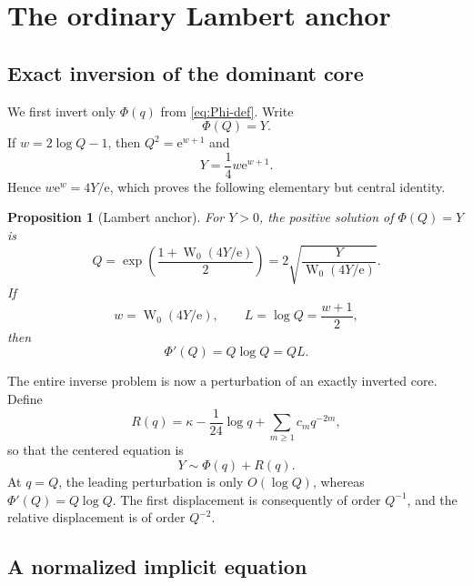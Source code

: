 \documentclass[11pt,oneside]{article}
\theoremstyle{plain}
\newtheorem{proposition}[theorem]{Proposition}
\theoremstyle{definition}
\theoremstyle{remark}
\newcommand{\W}{\operatorname{W}}
\newcommand{\e}{\mathrm{e}}
\begin{document}
\section{The ordinary Lambert anchor}
\label{sec:ordinary-anchor}

\subsection{Exact inversion of the dominant core}

We first invert only \(\Phi(q)\) from \eqref{eq:Phi-def}.  Write
\begin{equation}
 \Phi(Q)=Y.
 \label{eq:Phi-anchor-equation}
\end{equation}
If \(w=2\log Q-1\), then \(Q^2=\e^{w+1}\) and
\[
 Y=\frac14w\e^{w+1}.
\]
Hence \(w\e^w=4Y/\e\), which proves the following elementary but central
identity.

\begin{proposition}[Lambert anchor]
\label{prop:Lambert-anchor}
For \(Y>0\), the positive solution of \(\Phi(Q)=Y\) is
\begin{equation}
 Q=\exp\!\left(\frac{1+\W_0(4Y/\e)}2\right)
 =2\sqrt{\frac{Y}{\W_0(4Y/\e)}}.
 \label{eq:Q-anchor}
\end{equation}
If
\begin{equation}
 w=\W_0(4Y/\e),\qquad L=\log Q=\frac{w+1}{2},
 \label{eq:w-L}
\end{equation}
then
\begin{equation}
 \Phi'(Q)=Q\log Q=QL.
 \label{eq:Phi-prime}
\end{equation}
\end{proposition}

The entire inverse problem is now a perturbation of an exactly inverted core.
Define
\begin{equation}
 R(q)=\kappa-\frac1{24}\log q+
      \sum_{m\ge1}c_mq^{-2m},
 \label{eq:R-ordinary}
\end{equation}
so that the centered equation is
\begin{equation}
 Y\sim\Phi(q)+R(q).
 \label{eq:centered-inverse-equation}
\end{equation}
At \(q=Q\), the leading perturbation is only \(O(\log Q)\), whereas
\(\Phi'(Q)=Q\log Q\).  The first displacement is consequently of order
\(Q^{-1}\), and the relative displacement is of order \(Q^{-2}\).

\subsection{A normalized implicit equation}
\end{document}

